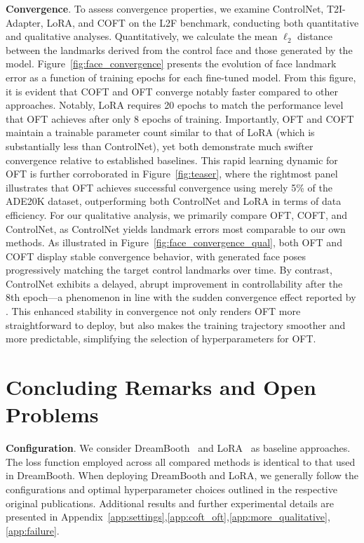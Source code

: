 \textbf{Convergence}. To assess convergence properties, we examine ControlNet, T2I-Adapter, LoRA, and COFT on the L2F benchmark, conducting both quantitative and qualitative analyses. Quantitatively, we calculate the mean $\ell_2$ distance between the landmarks derived from the control face and those generated by the model. Figure~\ref{fig:face_convergence} presents the evolution of face landmark error as a function of training epochs for each fine-tuned model. From this figure, it is evident that COFT and OFT converge notably faster compared to other approaches. Notably, LoRA requires 20 epochs to match the performance level that OFT achieves after only 8 epochs of training. Importantly, OFT and COFT maintain a trainable parameter count similar to that of LoRA (which is substantially less than ControlNet), yet both demonstrate much swifter convergence relative to established baselines. This rapid learning dynamic for OFT is further corroborated in Figure~\ref{fig:teaser}, where the rightmost panel illustrates that OFT achieves successful convergence using merely 5\% of the ADE20K dataset, outperforming both ControlNet and LoRA in terms of data efficiency. For our qualitative analysis, we primarily compare OFT, COFT, and ControlNet, as ControlNet yields landmark errors most comparable to our own methods. As illustrated in Figure~\ref{fig:face_convergence_qual}, both OFT and COFT display stable convergence behavior, with generated face poses progressively matching the target control landmarks over time. By contrast, ControlNet exhibits a delayed, abrupt improvement in controllability after the 8th epoch—a phenomenon in line with the sudden convergence effect reported by \cite{zhang2023adding}. This enhanced stability in convergence not only renders OFT more straightforward to deploy, but also makes the training trajectory smoother and more predictable, simplifying the selection of hyperparameters for OFT.

\section{Concluding Remarks and Open Problems}

\textbf{Configuration}. We consider DreamBooth~\cite{ruiz2023dreambooth} and LoRA~\cite{hulora2022} as baseline approaches. The loss function employed across all compared methods is identical to that used in DreamBooth. When deploying DreamBooth and LoRA, we generally follow the configurations and optimal hyperparameter choices outlined in the respective original publications. Additional results and further experimental details are presented in Appendix~\ref{app:settings},\ref{app:coft_oft},\ref{app:more_qualitative},\ref{app:failure}.

